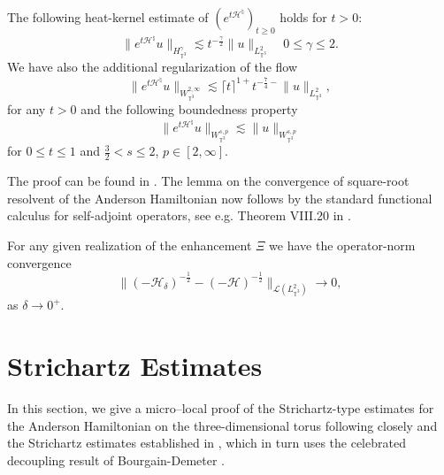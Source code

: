 \begin{lem}
  \label{lem:heat-kernel-Hsharp}The following heat-kernel estimate of $(e^{t
  \mathcal{H}^{\natural}})_{t \geqslant 0}$ holds for $t > 0$:
  \begin{equation}
    \| e^{t \mathcal{H}^{\natural}} u \|_{H_{\mathbb{T}^3}^{\gamma}} \lesssim
    t^{- \frac{\gamma}{2}} \| u \|_{L_{\mathbb{T}^3}^2} \quad 0 \leqslant
    \gamma \leqslant 2. \label{eq:heat-kernel-shorttime-Hsharp}
  \end{equation}
  We have also the additional regularization of the flow
  \begin{equation}
    \| e^{t \mathcal{H}^{\natural}} u \|_{W_{\mathbb{T}^3}^{2, \infty}}
    \lesssim \lceil t \rceil^{1 +} t^{- \frac{7}{4} -} \| u
    \|_{L_{\mathbb{T}^3}^2}, \label{eq:bound-sharp-heat-flow}
  \end{equation}
  for any $t > 0$ and the following boundedness property
  \begin{equation}
    \| e^{t \mathcal{H}^{\natural}} u \|_{W_{\mathbb{T}^3}^{s, p}} \lesssim \|
    u \|_{W_{\mathbb{T}^3}^{s, p}} \label{Wsp-heatbounded}
  \end{equation}
  for $0 \leqslant t \leqslant 1$ and $\frac{3}{2} < s \leqslant 2$, $p \in
  [2, \infty]$.
\end{lem}

The proof can be found in \cite[Lemma 2.12 \& B.1]{de2025stochastic}. The lemma on
the convergence of square-root resolvent of the Anderson Hamiltonian now
follows by the standard functional calculus for self-adjoint operators, see
  e.g. Theorem VIII.20 in {\cite{RS80}}.

\begin{lem}
  \label{lem:L2-green-AH}For any given realization of the enhancement $\Xi$ we
  have the operator-norm convergence
  \begin{equation}
    \| (- \mathcal{H}_{\delta})^{-\frac{1}{2}} - (- \mathcal{H})^{- \frac{1}{2}}
    \|_{\mathcal{L} (L_{\mathbb{T}^3}^2)} \rightarrow 0,
    \label{eq:unif-conv-mnssqrt-AH}
  \end{equation}
  as $\delta \rightarrow 0^+$. 
\end{lem}

\section{Strichartz Estimates}\label{sec:strichartz}

In this section, we give a micro--local proof of the Strichartz-type estimates for the Anderson
Hamiltonian on the three-dimensional torus following closely {\cite{Z19}} and
the Strichartz estimates established in {\cite{DJLM23}}, which in turn uses
the celebrated decoupling result of Bourgain-Demeter {\cite{BD15}}.

